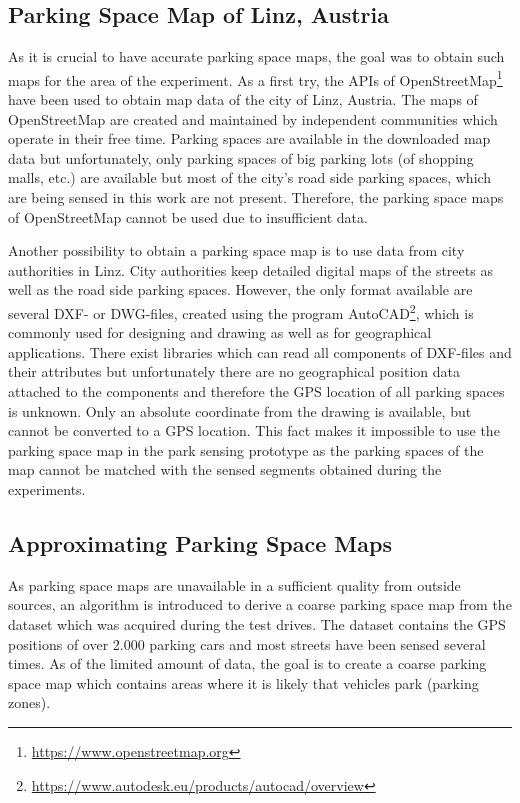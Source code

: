 \subsection{Parking Space Map of Linz, Austria}

As it is crucial to have accurate parking space maps, the goal was to obtain such maps for the area of the experiment. As a first try, the APIs of OpenStreetMap\footnote{\url{https://www.openstreetmap.org}} have been used to obtain map data of the city of Linz, Austria. The maps of OpenStreetMap are created and maintained by independent communities which operate in their free time. Parking spaces are available in the downloaded map data but unfortunately, only parking spaces of big parking lots (of shopping malls, etc.) are available but most of the city's road side parking spaces, which are being sensed in this work are not present. Therefore, the parking space maps of OpenStreetMap cannot be used due to insufficient data.

Another possibility to obtain a parking space map is to use data from city authorities in Linz. City authorities keep detailed digital maps of the streets as well as the road side parking spaces. However, the only format available are several DXF- or DWG-files, created using the program AutoCAD\footnote{\url{https://www.autodesk.eu/products/autocad/overview}}, which is commonly used for designing and drawing as well as for geographical applications. There exist libraries which can read all components of DXF-files and their attributes but unfortunately there are no geographical position data attached to the components and therefore the GPS location of all parking spaces is unknown. Only an absolute coordinate from the drawing is available, but cannot be converted to a GPS location. This fact makes it impossible to use the parking space map in the park sensing prototype as the parking spaces of the map cannot be matched with the sensed segments obtained during the experiments.



\subsection{Approximating Parking Space Maps}

As parking space maps are unavailable in a sufficient quality from outside sources, an algorithm is introduced to derive a coarse parking space map from the dataset which was acquired during the test drives. The dataset contains the GPS positions of over 2.000 parking cars and most streets have been sensed several times. As of the limited amount of data, the goal is to create a coarse parking space map which contains areas where it is likely that vehicles park (parking zones). 

